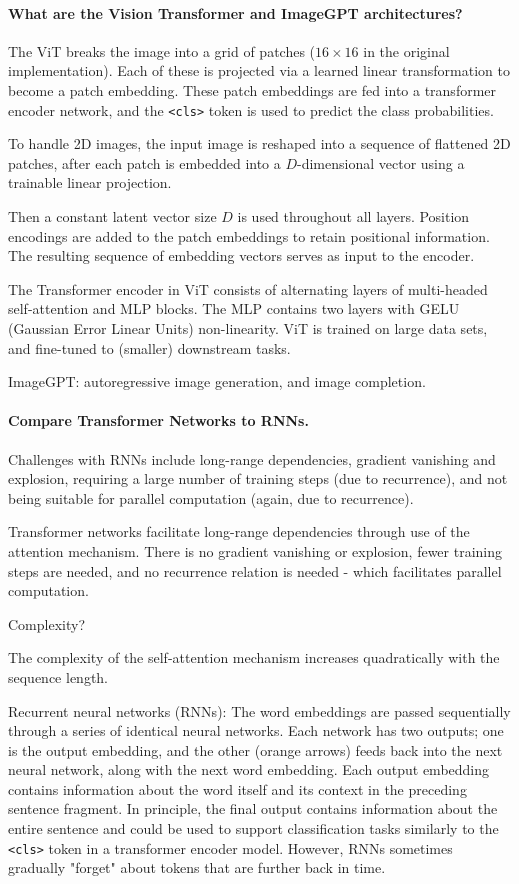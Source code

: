 \paragraph{What are the Vision Transformer and ImageGPT architectures?}

The ViT breaks the image into a grid of patches ($16 \times 16$ in the original implementation).
Each of these is projected via a learned linear transformation to become a patch embedding.
These patch embeddings are fed into a transformer encoder network, and the \texttt{<cls>} token is used to predict the class probabilities.

To handle 2D images, the input image is reshaped into a sequence of flattened 2D patches,
after each patch is embedded into a $D$-dimensional vector using a trainable linear projection.

Then a constant latent vector size $D$ is used throughout all layers.
Position encodings are added to the patch embeddings to retain positional information.
The resulting sequence of embedding vectors serves as input to the encoder.

The Transformer encoder in ViT consists of alternating layers of multi-headed
self-attention and MLP blocks. The MLP contains two layers
with GELU (Gaussian Error Linear Units) non-linearity. ViT is trained
on large data sets, and fine-tuned to (smaller) downstream tasks.

ImageGPT: autoregressive image generation, and image completion.

\paragraph{Compare Transformer Networks to RNNs.}

Challenges with RNNs include long-range dependencies, gradient vanishing and explosion,
requiring a large number of training steps (due to recurrence), and
not being suitable for parallel computation (again, due to recurrence).

Transformer networks facilitate long-range dependencies through use of the attention mechanism.
There is no gradient vanishing or explosion, fewer training steps are needed,
and no recurrence relation is needed - which facilitates parallel computation.

Complexity?

The complexity of the self-attention mechanism increases quadratically with the sequence length.

Recurrent neural networks (RNNs): The word embeddings are
passed sequentially through a series of identical neural networks. Each network
has two outputs; one is the output embedding, and the other (orange arrows)
feeds back into the next neural network, along with the next word embedding.
Each output embedding contains information about the word itself and its context
in the preceding sentence fragment. In principle, the final output contains
information about the entire sentence and could be used to support classification
tasks similarly to the \texttt{<cls>} token in a transformer encoder model. However,
RNNs sometimes gradually "forget" about tokens that are further back in time.


